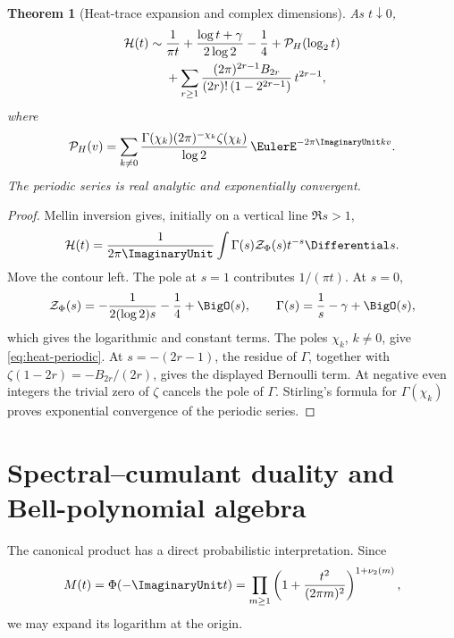 \documentclass[11pt,oneside]{article}
\newtheorem{theorem}{Theorem}[section]
\theoremstyle{definition}
\theoremstyle{remark}
\begin{document}
\begin{theorem}[Heat-trace expansion and complex dimensions]
\label{thm:heat}
As \(t\downarrow0\),
\begin{align}
 \mathcal H(t)
 \sim{}&
 \frac1{\pi t}
 +\frac{\log t+\gamma}{2\log2}
 -\frac14
 +\mathcal P_H(\log_2t)
 \notag\\
 &+
 \sum_{r\geq1}
 \frac{(2\pi)^{2r-1}B_{2r}}
      {(2r)!\,(1-2^{2r-1})}\,t^{2r-1},
 \label{eq:heat-expansion}
\end{align}
where
\begin{equation}
 \mathcal P_H(v)
 =\sum_{k\neq0}
 \frac{\Gamma(\chi_k)(2\pi)^{-\chi_k}\zeta(\chi_k)}
      {\log2}\,
 \EulerE^{-2\pi\ImaginaryUnit kv}.
 \label{eq:heat-periodic}
\end{equation}
The periodic series is real analytic and exponentially convergent.
\end{theorem}

\begin{proof}
Mellin inversion gives, initially on a vertical line \(\Re s>1\),
\[
 \mathcal H(t)
 =\frac1{2\pi\ImaginaryUnit}\int
   \Gamma(s)\mathcal Z_\Phi(s)t^{-s}\Differential s.
\]
Move the contour left.  The pole at \(s=1\) contributes \(1/(\pi t)\).
At \(s=0\),
\[
 \mathcal Z_\Phi(s)
 =-\frac1{2(\log2)s}-\frac14+\BigO(s),
 \qquad
 \Gamma(s)=\frac1s-\gamma+\BigO(s),
\]
which gives the logarithmic and constant terms.  The poles
\(\chi_k\), \(k\neq0\), give \eqref{eq:heat-periodic}.  At
\(s=-(2r-1)\), the residue of \(\Gamma\), together with
\(\zeta(1-2r)=-B_{2r}/(2r)\), gives the displayed Bernoulli term.  At
negative even integers the trivial zero of \(\zeta\) cancels the pole of
\(\Gamma\).  Stirling's formula for \(\Gamma(\chi_k)\) proves exponential
convergence of the periodic series.
\end{proof}

\section{Spectral--cumulant duality and Bell-polynomial algebra}

The canonical product has a direct probabilistic interpretation.  Since
\[
 M(t)=\Phi(-\ImaginaryUnit t)
 =\prod_{m\geq1}
  \left(1+\frac{t^2}{(2\pi m)^2}\right)^{1+\nu_2(m)},
\]
we may expand its logarithm at the origin.
\end{document}

